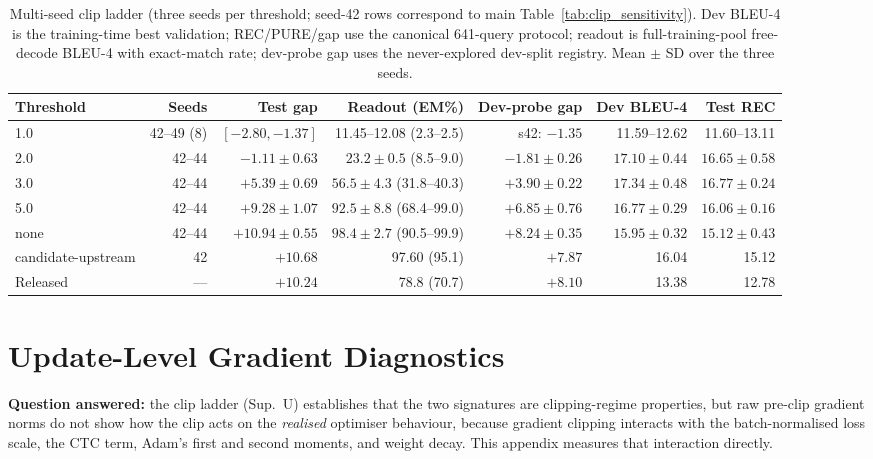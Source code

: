 \documentclass[pdflatex,sn-chicago]{sn-jnl}
\begin{document}
\begin{table}[h]
\centering
\scriptsize\setlength{\tabcolsep}{4pt}
\caption{Multi-seed clip ladder (three seeds per threshold; seed-42 rows correspond to main Table~\ref{tab:clip_sensitivity}). Dev BLEU-4 is the training-time best validation; REC/PURE/gap use the canonical 641-query protocol; readout is full-training-pool free-decode BLEU-4 with exact-match rate; dev-probe gap uses the never-explored dev-split registry. Mean $\pm$ SD over the three seeds.}
\label{tab:clip_ladder_multiseed}
\begin{tabular}{lrrrrrr}
\toprule
Threshold & Seeds & Test gap & Readout (EM\%) & Dev-probe gap & Dev BLEU-4 & Test REC \\
\midrule
1.0 & 42--49 (8) & $[-2.80,-1.37]$ & 11.45--12.08 (2.3--2.5) & s42: $-1.35$ & 11.59--12.62 & 11.60--13.11 \\
2.0 & 42--44 & $-1.11\pm0.63$ & $23.2\pm0.5$ (8.5--9.0) & $-1.81\pm0.26$ & $17.10\pm0.44$ & $16.65\pm0.58$ \\
3.0 & 42--44 & $+5.39\pm0.69$ & $56.5\pm4.3$ (31.8--40.3) & $+3.90\pm0.22$ & $17.34\pm0.48$ & $16.77\pm0.24$ \\
5.0 & 42--44 & $+9.28\pm1.07$ & $92.5\pm8.8$ (68.4--99.0) & $+6.85\pm0.76$ & $16.77\pm0.29$ & $16.06\pm0.16$ \\
none & 42--44 & $+10.94\pm0.55$ & $98.4\pm2.7$ (90.5--99.9) & $+8.24\pm0.35$ & $15.95\pm0.32$ & $15.12\pm0.43$ \\
candidate-upstream & 42 & $+10.68$ & 97.60 (95.1) & $+7.87$ & 16.04 & 15.12 \\
\midrule
Released & --- & $+10.24$ & 78.8 (70.7) & $+8.10$ & 13.38 & 12.78 \\
\bottomrule
\end{tabular}
\end{table}

\section{Update-Level Gradient Diagnostics}
\label{sec:appendix_update_diag}
\textbf{Question answered:} the clip ladder (Sup.~U) establishes that the two signatures are clipping-regime properties, but raw pre-clip gradient norms do not show how the clip acts on the \emph{realised} optimiser behaviour, because gradient clipping interacts with the batch-normalised loss scale, the CTC term, Adam's first and second moments, and weight decay. This appendix measures that interaction directly.
\end{document}
